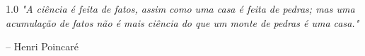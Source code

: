 
\null
\vfill %

\begin{flushright}
  \begin{minipage}{8cm}
    \begin{spacing}{1.0}
      \itshape
      "A ciência é feita de fatos, assim como uma casa é feita de pedras; 
      mas uma acumulação de fatos não é mais ciência do que um monte de 
      pedras é uma casa."
      
      \vspace{0.3cm}
      \noindent
      \small{-- Henri Poincaré}
    \end{spacing}
  \end{minipage}
\end{flushright}
